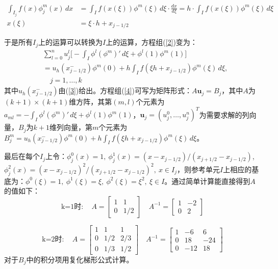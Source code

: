 \documentclass[12pt, a4paper]{ctexart}
\begin{document}
	\begin{equation}
	\begin{split}
	\int_{I_j} f(x) \phi_j^m (x) \, dx & = \int_I f(x(\xi)) \phi^m (\xi) \, d\xi \cdot \frac{dx}{d\xi} = h \cdot \int_I f(x(\xi)) \phi^m (\xi) \, d\xi\\
	x(\xi) & = \xi \cdot h +x_{j-1/2}
	\end{split}
	\end{equation}
	
	于是所有$I_j$上的运算可以转换为$I$上的运算，方程组(\ref{2})变为：
	\begin{equation}
	\begin{split}
	& \sum_{l=0}^n u_j^l \big[ - \int_{I} \phi^l (\phi^m)' \, d\xi + \phi^l(1) \phi^m(1) \big]\\
	& = u_h(x_{j-1/2}^-) \phi^m(0) + h \int_I f(\xi h + x_{j - 1/2})\phi^m(\xi) \, d\xi,\\
	& \quad j= 1, \dots , k
	\end{split}
	\label{4}
	\end{equation}
	其中$u_h(x_{j-1/2}^-)$由(\ref{3})给出。方程组(\ref{4})可写为矩阵形式：$A \textbf{u}_j = B_j$，其中$A$为$(k+1) \times (k+1)$维方阵，其第$(m,l)$个元素为$a_{ml} = - \int_{I} \phi^l (\phi^m)' \, d\xi + \phi^l(1) \phi^m(1)$，$\textbf{u}_j = (u_j^0, \dots, u_j^n)^T$为需要求解的列向量，$B_j$为$k+1$维列向量，第$m$个元素为$B_j^m = u_h(x_{j-1/2}^-) \phi^m(0) + h \int_I f(\xi h + x_{j - 1/2})\phi^m(\xi) \, d\xi$。
		
	最后在每个$I_j$上令：$\phi_j^0(x) = 1, \  \phi_j^1(x) = (x- x_{j-1/2})/(x_{j+1/2}-x_{j-1/2})$, $\phi_j^2(x) = (x- x_{j-1/2})^2/(x_{j+1/2}-x_{j-1/2})^2, \  x \in I_j$，则参考单元$I$上相应的基底为：$ \phi^0(\xi) = 1, \  \phi^1(\xi) = \xi, \ \phi^2(\xi) = \xi^2, \ \xi \in I$。通过简单计算能直接得到$A$的值如下：
	\begin{equation}
	\mbox{k=1时}: \quad A=
	\begin{bmatrix}
	1 & 1 \\
	0 & 1/2
	\end{bmatrix}
	\quad A^{-1} = 
	\begin{bmatrix}
	1 & -2 \\
	0 & 2
	\end{bmatrix}
	\end{equation}
	
	\begin{equation}
	\mbox{k=2时}: \quad A = 
	\begin{bmatrix}
	1 & 1 & 1 \\
	0 & 1/2 & 2/3 \\
	0 & 1/3 & 1/2
	\end{bmatrix}
	\quad A^{-1} = 
	\begin{bmatrix}
	1 & -6 & 6\\
	0 & 18 & -24\\
	0 & -12 & 18
	\end{bmatrix}
	\end{equation}
	对于$B_j$中的积分项用复化梯形公式计算。
	
\end{document}

